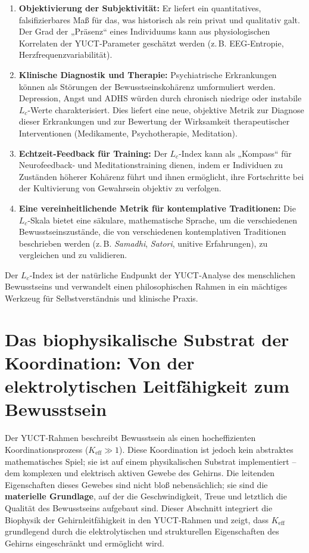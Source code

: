 \documentclass[12pt,a4paper]{article}
\begin{document}
	\begin{enumerate}
		\item \textbf{Objektivierung der Subjektivität:} Er liefert ein quantitatives, falsifizierbares Maß für das, was historisch als rein privat und qualitativ galt. Der Grad der „Präsenz“ eines Individuums kann aus physiologischen Korrelaten der YUCT‑Parameter geschätzt werden (z. B. EEG‑Entropie, Herzfrequenzvariabilität).
		\item \textbf{Klinische Diagnostik und Therapie:} Psychiatrische Erkrankungen können als Störungen der Bewusstseinskohärenz umformuliert werden. Depression, Angst und ADHS würden durch chronisch niedrige oder instabile \(L_c\)-Werte charakterisiert. Dies liefert eine neue, objektive Metrik zur Diagnose dieser Erkrankungen und zur Bewertung der Wirksamkeit therapeutischer Interventionen (Medikamente, Psychotherapie, Meditation).
		\item \textbf{Echtzeit‑Feedback für Training:} Der \(L_c\)-Index kann als „Kompass“ für Neurofeedback‑ und Meditationstraining dienen, indem er Individuen zu Zuständen höherer Kohärenz führt und ihnen ermöglicht, ihre Fortschritte bei der Kultivierung von Gewahrsein objektiv zu verfolgen.
		\item \textbf{Eine vereinheitlichende Metrik für kontemplative Traditionen:} Die \(L_c\)-Skala bietet eine säkulare, mathematische Sprache, um die verschiedenen Bewusstseinszustände, die von verschiedenen kontemplativen Traditionen beschrieben werden (z. B. \textit{Samadhi}, \textit{Satori}, unitive Erfahrungen), zu vergleichen und zu validieren.
	\end{enumerate}
	
	Der \(L_c\)-Index ist der natürliche Endpunkt der YUCT‑Analyse des menschlichen Bewusstseins und verwandelt einen philosophischen Rahmen in ein mächtiges Werkzeug für Selbstverständnis und klinische Praxis.
	
	\section{Das biophysikalische Substrat der Koordination: Von der elektrolytischen Leitfähigkeit zum Bewusstsein}
	
	Der YUCT‑Rahmen beschreibt Bewusstsein als einen hocheffizienten Koordinationsprozess (\(K_{\mathrm{eff}} \gg 1\)). Diese Koordination ist jedoch kein abstraktes mathematisches Spiel; sie ist auf einem physikalischen Substrat implementiert – dem komplexen und elektrisch aktiven Gewebe des Gehirns. Die leitenden Eigenschaften dieses Gewebes sind nicht bloß nebensächlich; sie sind die \textbf{materielle Grundlage}, auf der die Geschwindigkeit, Treue und letztlich die Qualität des Bewusstseins aufgebaut sind. Dieser Abschnitt integriert die Biophysik der Gehirnleitfähigkeit in den YUCT‑Rahmen und zeigt, dass \(K_{\mathrm{eff}}\) grundlegend durch die elektrolytischen und strukturellen Eigenschaften des Gehirns eingeschränkt und ermöglicht wird.
	
\end{document}
